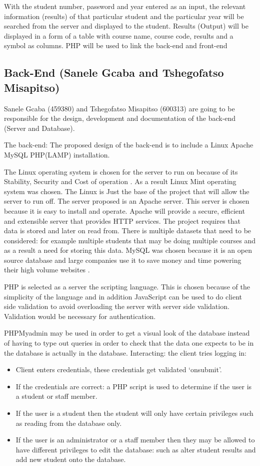 \documentclass[10pt,onecolumn]{RequimentsGathering}
\begin{document}
	With the student number, password and year entered as an input, the relevant information (results) of that particular student and the particular year will be searched from the server and displayed to the student. Results (Output) will be displayed in a form of a table with course name, course code, results and a symbol as columns. PHP will be used to link the back-end and front-end
	
	\subsection{Back-End (Sanele Gcaba and Tshegofatso Misapitso)}
	Sanele Gcaba (459380) and Tshegofatso Misapitso (600313)  are going to be responsible for the design, development and documentation of the back-end (Server and Database).
	
	The back-end:
	The proposed design of the back-end is to include a Linux Apache MySQL PHP(LAMP) installation.
	
	The Linux operating system is chosen for the server to run on because of its Stability, Security and Cost of operation \cite{ref1}.   
	As a result Linux Mint operating system was chosen.
	The Linux is Just the base of the project that will allow the server to run off. The server proposed is an Apache server. This server is chosen because it is easy to install and operate. Apache will provide a secure, efficient and extensible server that provides HTTP services.
	The project requires that data is stored and later on read from. There is multiple datasets that need to be considered: for example multiple students that may be doing multiple courses and as a result a need for storing this data. MySQL was chosen because it is an open source database and large companies use it to save money and time powering their high volume websites \cite{ref2}.
	
	PHP is  selected as a server the scripting language. This is chosen because of the simplicity of the language and in addition JavaScript can be used to do client side validation to avoid overloading the server with server side validation. Validation would be necessary for authentication. 
	
	PHPMyadmin may be used in order to get a visual look of the database instead of having to type out queries in order to check that the data one expects to be in the database is actually in the database. 
	Interacting: the client tries logging in:
	
	\begin{itemize}
		\item Client enters credentials, these credentials get validated ‘onsubmit’.
		\item If the credentials are correct: a PHP script is used to determine if the user is a  student or staff member.
		\item If the user is a student then the student will only have certain privileges such as reading from the database only.
		\item If the user is an administrator or a staff member then they may be allowed to have different privileges to edit the database: such as alter student results and add new student onto the database.
	\end{itemize}
	
\end{document}
